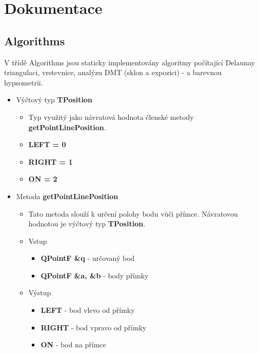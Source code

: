 \documentclass[a4paper, 12pt]{article}
\begin{document}
\clearpage


\section {Dokumentace}

\subsection{Algorithms}
V třídě Algorithms jsou staticky implementovány algoritmy počítající Delaunay triangulaci, vrstevnice, analýzu DMT (sklon a expozici) - a barevnou hypsometrii. 

\begin{itemize}

	\item Výčtový typ \textbf{TPosition}
		\begin{itemize}
			\item Typ využitý jako návratová hodnota členské metody \textbf{getPointLinePosition}.
			\item \textbf{LEFT = 0}
			\item \textbf{RIGHT = 1}
			\item \textbf{ON = 2}
		\end{itemize}

	\item Metoda \textbf{getPointLinePosition}
		\begin{itemize}
			\item Tato metoda slouží k určení polohy bodu vůči přímce. Návratovou hodnotou je výčtový typ \textbf{TPosition}.
			\item Vstup
				\begin{itemize}
					\item \textbf{QPointF \&q} - určovaný bod
					\item \textbf{QPointF \&a, \&b} - body přímky
				\end{itemize}
			\item Výstup
				\begin{itemize}
					\item \textbf{LEFT} - bod vlevo od přímky
					\item \textbf{RIGHT} - bod vpravo od přímky
					\item \textbf{ON} - bod na přímce
				\end{itemize}

		\end{itemize}



\end{itemize}
\end{document}
